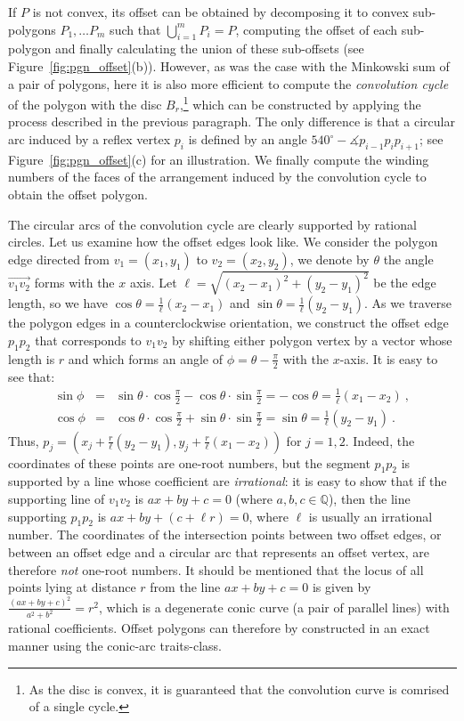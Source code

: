 If $P$ is not convex, its offset can be obtained by decomposing it
to convex sub-polygons $P_1, \ldots P_m$ such that
$\bigcup_{i=1}^{m}{P_i} = P$, computing the offset of each
sub-polygon and finally calculating the union of these sub-offsets
(see Figure~\ref{fig:pgn_offset}(b)). However, as was the case with
the Minkowski sum of a pair of polygons, here it is also more
efficient to compute the \emph{convolution cycle} of the polygon
with the disc $B_r$,\footnote{As the disc is convex, it is guaranteed
that the convolution curve is comrised of a single cycle.} which can be
constructed by applying the process described in the previous
paragraph. The only difference is that a circular arc induced by a
reflex vertex $p_i$ is defined by an angle $540^{\circ} - \measuredangle
p_{i-1} p_i p_{i+1}$; see Figure~\ref{fig:pgn_offset}(c) for an
illustration. We finally compute the winding numbers of the faces of the
arrangement induced by the convolution cycle to obtain the offset
polygon.


The circular arcs of the convolution cycle are clearly supported
by rational circles. Let us examine how the offset edges look
like. We consider the polygon edge directed from $v_1 = (x_1,
y_1)$ to $v_2 = (x_2, y_2)$, we denote by $\theta$ the angle
$\vec{v_1 v_2}$ forms with the $x$ axis. Let $\ell = \sqrt{(x_2 -
x_1)^2 + (y_2 - y_1)^2}$ be the edge length, so we have
$\cos\theta = \frac{1}{\ell}(x_2 - x_1)$ and $\sin\theta =
\frac{1}{\ell}(y_2 - y_1)$. As we traverse the polygon edges in a
counterclockwise orientation, we construct the offset edge $p_1
p_2$ that corresponds to $v_1 v_2$ by shifting either polygon
vertex by a vector whose length is $r$ and which forms an angle of
$\phi = \theta - \frac{\pi}{2}$ with the $x$-axis. It is easy to
see that:
\begin{eqnarray}
\sin\phi &=& \sin\theta\cdot\cos\frac{\pi}{2} -
             \cos\theta\cdot\sin\frac{\pi}{2}
         = - \cos\theta = \frac{1}{\ell}(x_1 - x_2) \ , \\
\cos\phi &=& \cos\theta\cdot\cos\frac{\pi}{2} +
             \sin\theta\cdot\sin\frac{\pi}{2}
         = \sin\theta = \frac{1}{\ell}(y_2 - y_1) \ .
\end{eqnarray}
Thus, $p_j = \left( x_j + \frac{r}{\ell}(y_2 - y_1), y_j +
\frac{r}{\ell}(x_1 - x_2) \right)$ for $j = 1,2$. Indeed, the
coordinates of these points are one-root numbers, but the segment
$p_1 p_2$ is supported by a line whose coefficient are
\emph{irrational}: it is easy to show that if the supporting line
of $v_1 v_2$ is $a x + b y + c = 0$ (where $a,b,c \in {\mathbb Q}$),
then the line supporting $p_1 p_2$ is $a x + b y + (c + \ell r) =
0$, where $\ell$ is usually an irrational number. The coordinates
of the intersection points between two offset edges, or between an
offset edge and a circular arc that represents an offset vertex,
are therefore \emph{not} one-root numbers. It should be mentioned
that the locus of all points lying at distance $r$ from the line
$a x + b y + c = 0$ is given by $\frac{(a x + b y + c)^2}{a^2 +
b^2} = r^2$, which is a degenerate conic curve (a pair of parallel
lines) with rational coefficients. Offset polygons can therefore
by constructed in an exact manner using the conic-arc
traits-class.
